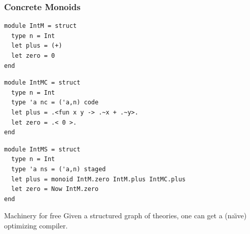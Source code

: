 \documentclass{beamer}
\begin{document}
\lstset{language=metaocaml,basicstyle=\scriptsize}
\begin{frame}[t,fragile]
\frametitle{Concrete Monoids}
\begin{minipage}{5.4cm}
\begin{lstlisting}
module IntM = struct
  type n = Int
  let plus = (+)
  let zero = 0
end
\end{lstlisting}
\end{minipage}
\begin{minipage}{5.4cm}
\begin{lstlisting}
module IntMC = struct
  type n = Int
  type 'a nc = ('a,n) code
  let plus = .<fun x y -> .~x + .~y>.
  let zero = .< 0 >.
end
\end{lstlisting}
\end{minipage}
\vspace*{.3cm}
\begin{lstlisting}
module IntMS = struct
  type n = Int
  type 'a ns = ('a,n) staged
  let plus = monoid IntM.zero IntM.plus IntMC.plus
  let zero = Now IntM.zero
end
\end{lstlisting}
\pause
\begin{block}{Machinery for free}
Given a structured graph of theories, one can get a (na\"{\i}ve)
optimizing compiler.
\end{block}
\end{frame}
\end{document}
